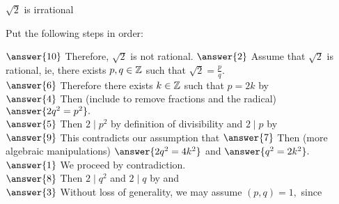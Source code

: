 \documentclass{ximera}
\begin{document}
\begin{br}
	\begin{proposition}
		$\sqrt{2}$ is irrational
	\end{proposition}



	\begin{prompt}
		Put the following steps in order:

			
			$\answer{10}$ Therefore, $\sqrt{2}$ is not rational.
			$\answer{2}$ Assume that $\sqrt{2}$ is rational, ie, there exists $p,q\in\mathbb Z$ such that $\sqrt{2}=\frac{p}{q}$.\\
			$\answer{6}$ Therefore there exists $k\in\mathbb Z$ such that $p=2k$ by   \\
			$\answer{4}$ Then (include to remove fractions and the radical) $\answer{2q^2=p^2}.$\\
			$\answer{5}$ Then $2\mid p^2$ by definition of divisibility and $2\mid p$ by   \\
				$\answer{9}$ This contradicts our assumption that 
			$\answer{7}$ Then (more algebraic manipulations) $\answer{2q^2=4k^2}$ and $\answer{q^2=2k^2}.$\\
			$\answer{1}$ We proceed by contradiction.\\
			$\answer{8}$ Then $2\mid q^2$ and $2\mid q$ by 
				and 	  \\
			$\answer{3}$ Without loss of generality, we may assume $(p,q)=1,$ since \\
			
	\end{prompt}
\end{br}
\end{document}
